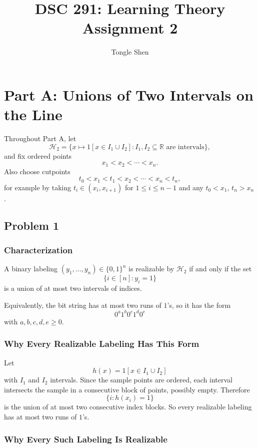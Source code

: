 \documentclass{article}
\title{DSC 291: Learning Theory Assignment 2}
\author{Tongle Shen}
\begin{document}
\maketitle

\section{Part A: Unions of Two Intervals on the Line}

Throughout Part A, let
$$
\mathcal{H}_2
=
\{x \mapsto 1[x \in I_1 \cup I_2] : I_1, I_2 \subseteq \mathbb{R} \text{ are intervals}\},
$$
and fix ordered points
$$
x_1 < x_2 < \cdots < x_n.
$$
Also choose cutpoints
$$
t_0 < x_1 < t_1 < x_2 < \cdots < x_n < t_n,
$$
for example by taking $t_i \in (x_i,x_{i+1})$ for $1 \le i \le n-1$ and any $t_0 < x_1$, $t_n > x_n$.

\subsection{Problem 1}

\subsubsection{Characterization}

A binary labeling $(y_1,\dots,y_n) \in \{0,1\}^n$ is realizable by $\mathcal{H}_2$ if and only if the set
$$
\{i \in [n] : y_i = 1\}
$$
is a union of at most two intervals of indices.

Equivalently, the bit string has at most two runs of $1$'s, so it has the form
$$
0^a 1^b 0^c 1^d 0^e
$$
with $a,b,c,d,e \ge 0$.

\subsubsection{Why Every Realizable Labeling Has This Form}

Let
$$
h(x) = 1[x \in I_1 \cup I_2]
$$
with $I_1$ and $I_2$ intervals. Since the sample points are ordered, each interval intersects the sample in a consecutive block of points, possibly empty. Therefore
$$
\{i : h(x_i) = 1\}
$$
is the union of at most two consecutive index blocks. So every realizable labeling has at most two runs of $1$'s.

\subsubsection{Why Every Such Labeling Is Realizable}
\end{document}
